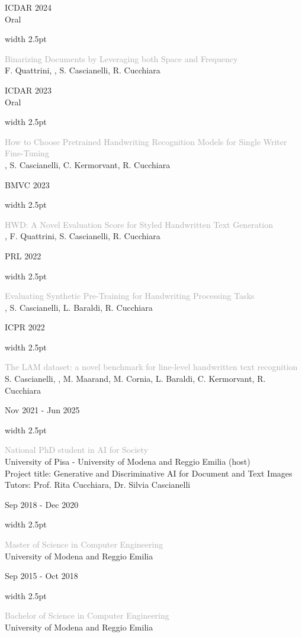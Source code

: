 \documentclass[10pt,a4paper]{article}
\newcommand{\cvsection}[1]{
    \vspace{2.2ex}
    \noindent{\Large \textcolor{darkgray}{#1}}
    \vspace{0.8ex}\par
}
\newcommand{\cventry}[3]{
    \par\noindent
    \begin{minipage}[t]{0.19\textwidth}
        \raggedleft \footnotesize \textcolor{textgray}{#2}
    \end{minipage}%
    \hspace{0.015\textwidth}%
    \textcolor{#1}{\vrule width 2.5pt}%
    \hspace{0.015\textwidth}%
    \begin{minipage}[t]{0.75\textwidth}
        \footnotesize #3
    \end{minipage}
    \par\vspace{0.6ex}
}
\begin{document}
\cventry{pub2}{ICDAR 2024 \\ \textcolor{pub2}{Oral}}{\textcolor{darkgray}{Binarizing Documents by Leveraging both Space and Frequency} \\ \textcolor{textgray}{F. Quattrini, , S. Cascianelli, R. Cucchiara}}

\cventry{pub2}{ICDAR 2023 \\ \textcolor{pub2}{Oral}}{\textcolor{darkgray}{How to Choose Pretrained Handwriting Recognition Models for Single Writer Fine-Tuning} \\ \textcolor{textgray}{, S. Cascianelli, C. Kermorvant, R. Cucchiara}}

\cventry{pub3}{BMVC 2023}{\textcolor{darkgray}{HWD: A Novel Evaluation Score for Styled Handwritten Text Generation} \\ \textcolor{textgray}{, F. Quattrini, S. Cascianelli, R. Cucchiara}}

\cventry{pub3}{PRL 2022}{\textcolor{darkgray}{Evaluating Synthetic Pre-Training for Handwriting Processing Tasks} \\ \textcolor{textgray}{, S. Cascianelli, L. Baraldi, R. Cucchiara}}

\cventry{pub3}{ICPR 2022}{\textcolor{darkgray}{The LAM dataset: a novel benchmark for line-level handwritten text recognition} \\ \textcolor{textgray}{S. Cascianelli, \hlbox{V. Pippi}, M. Maarand, M. Cornia, L. Baraldi, C. Kermorvant, R. Cucchiara}}

\cvsection{Education}

\cventry{edu1}{Nov 2021 - Jun 2025}{\textcolor{darkgray}{National PhD student in AI for Society} \\ \textcolor{textgray}{University of Pisa - University of Modena and Reggio Emilia (host) \\ Project title: Generative and Discriminative AI for Document and Text Images \\ Tutors: Prof. Rita Cucchiara, Dr. Silvia Cascianelli}}

\cventry{edu2}{Sep 2018 - Dec 2020}{\textcolor{darkgray}{Master of Science in Computer Engineering} \\ \textcolor{textgray}{University of Modena and Reggio Emilia}}

\cventry{edu3}{Sep 2015 - Oct 2018}{\textcolor{darkgray}{Bachelor of Science in Computer Engineering} \\ \textcolor{textgray}{University of Modena and Reggio Emilia}}
\end{document}
